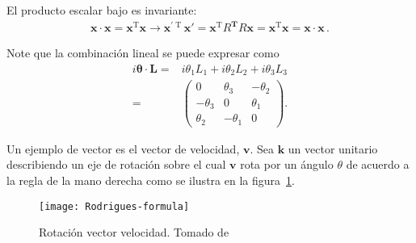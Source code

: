 El producto escalar bajo es invariante:
\begin{align}
  \label{eq:psso3}
  \boldsymbol{x}\cdot \boldsymbol{x}= \boldsymbol{x}^{\operatorname{T}} \boldsymbol{x}\to \boldsymbol{x}^{\prime\operatorname{T}} \boldsymbol{x}'
  =\boldsymbol{x}^{\operatorname{T}}R^{\boldsymbol{T}} R \boldsymbol{x}=\boldsymbol{x}^{\operatorname{T}} \boldsymbol{x}=  \boldsymbol{x}\cdot \boldsymbol{x}\,.
\end{align}

Note que la combinación lineal se puede expresar como
\begin{align}
  i\boldsymbol{\theta}\cdot\boldsymbol{L}=& i\theta_1 L_1+i\theta_2 L_2+i\theta_3 L_3 \nonumber\\
=&   \begin{pmatrix}
  0           & \theta_3 & -\theta_2 \\
  -\theta_3   &  0       & \theta_1 \\
  \theta_2    & -\theta_1 & 0
   \end{pmatrix}.
\end{align}

Un ejemplo de vector es el vector de velocidad, $\boldsymbol{v}$. Sea $\boldsymbol{k}$ un vector unitario describiendo un eje de rotación sobre el cual $\boldsymbol{v}$ rota por un ángulo $\theta$ de acuerdo a la regla de la mano derecha como se ilustra en la figura~\ref{fig:rf}.
\begin{figure}
  \centering
  \texttt{[image: Rodrigues-formula]}
  \caption{Rotación vector velocidad. Tomado de \cite{rodriguez}}
  \label{fig:rf}
\end{figure}

